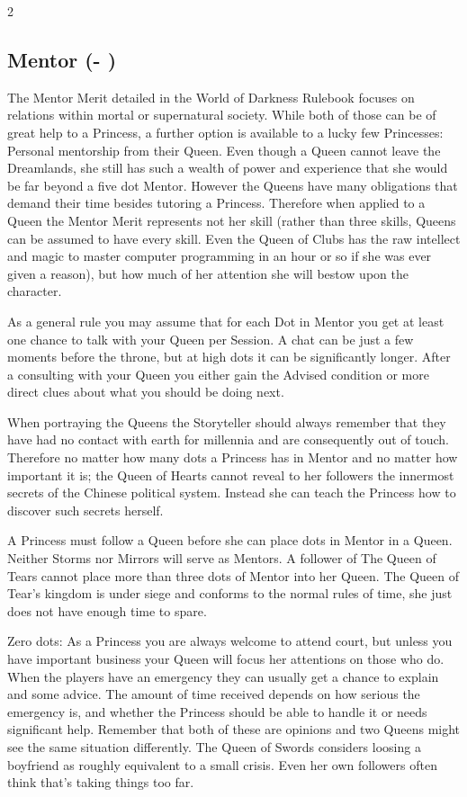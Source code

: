 \begin{multicols}{2}
\subsection*{Mentor (\textbullet - \textbullet\textbullet\textbullet\textbullet\textbullet)}

The Mentor Merit detailed in the World of Darkness Rulebook focuses on relations within mortal or supernatural society. While both of those can be of great help to a Princess, a further option is available to a lucky few Princesses: Personal mentorship from their Queen. Even though a Queen cannot leave the Dreamlands, she still has such a wealth of power and experience that she would be far beyond a five dot Mentor. However the Queens have many obligations that demand their time besides tutoring a Princess. Therefore when applied to a Queen the Mentor Merit represents not her skill (rather than three skills, Queens can be assumed to have every skill. Even the Queen of Clubs has the raw intellect and magic to master computer programming in an hour or so if she was ever given a reason), but how much of her attention she will bestow upon the character.

As a general rule you may assume that for each Dot in Mentor you get at least one chance to talk with your Queen per Session. A chat can be just a few moments before the throne, but at high dots it can be significantly longer. After a consulting with your Queen you either gain the Advised condition or more direct clues about what you should be doing next. 

When portraying the Queens the Storyteller should always remember that they have had no contact with earth for millennia and are consequently out of touch. Therefore no matter how many dots a Princess has in Mentor and no matter how important it is; the Queen of Hearts cannot reveal to her followers the innermost secrets of the Chinese political system. Instead she can teach the Princess how to discover such secrets herself.

A Princess must follow a Queen before she can place dots in Mentor in a Queen. Neither Storms nor Mirrors will serve as Mentors. A follower of The Queen of Tears cannot place more than three dots of Mentor into her Queen. The Queen of Tear's kingdom is under siege and conforms to the normal rules of time, she just does not have enough time to spare.

Zero dots: As a Princess you are always welcome to attend court, but unless you have important business your Queen will focus her attentions on those who do. When the players have an emergency they can usually get a chance to explain and some advice. The amount of time received depends on how serious the emergency is, and whether the Princess should be able to handle it or needs significant help. Remember that both of these are opinions and two Queens might see the same situation differently. The Queen of Swords considers loosing a boyfriend as roughly equivalent to a small crisis. Even her own followers often think that's taking things too far.


\end{multicols}
